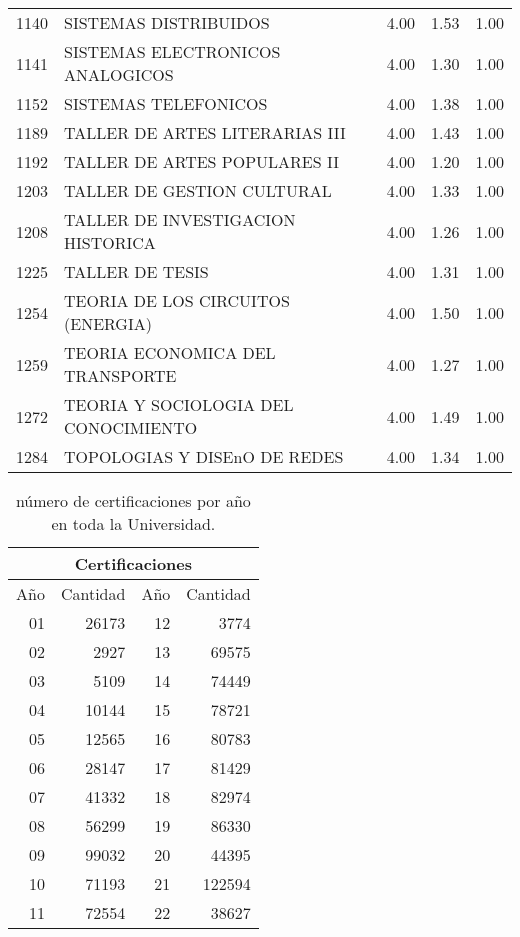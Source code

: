 \documentclass[12pt]{article}
\begin{document}
\begin{table}[ht]
\begin{tabular}{rlrrr}
  1140 & SISTEMAS DISTRIBUIDOS & 4.00 & 1.53 & 1.00 \\ 
  1141 & SISTEMAS ELECTRONICOS ANALOGICOS & 4.00 & 1.30 & 1.00 \\ 
  1152 & SISTEMAS TELEFONICOS & 4.00 & 1.38 & 1.00 \\ 
  1189 & TALLER DE ARTES LITERARIAS III & 4.00 & 1.43 & 1.00 \\ 
  1192 & TALLER DE ARTES POPULARES II & 4.00 & 1.20 & 1.00 \\ 
  1203 & TALLER DE GESTION CULTURAL & 4.00 & 1.33 & 1.00 \\ 
  1208 & TALLER DE INVESTIGACION HISTORICA & 4.00 & 1.26 & 1.00 \\ 
  1225 & TALLER DE TESIS & 4.00 & 1.31 & 1.00 \\ 
  1254 & TEORIA DE LOS CIRCUITOS (ENERGIA) & 4.00 & 1.50 & 1.00 \\ 
  1259 & TEORIA ECONOMICA DEL TRANSPORTE & 4.00 & 1.27 & 1.00 \\ 
  1272 & TEORIA Y SOCIOLOGIA DEL CONOCIMIENTO & 4.00 & 1.49 & 1.00 \\ 
  1284 & TOPOLOGIAS Y DISEnO DE REDES & 4.00 & 1.34 & 1.00 \\ 
   \hline
\end{tabular}
\end{table}



\begin{table}[ht]
\centering
\begin{tabular}{||r||r||r|r||}\hline
\multicolumn{4}{|c|}{Certificaciones} \\\hline
Año  & Cantidad  & Año  & Cantidad  \\\hline
01 & 26173& 12 & 3774 \\ 
  02 & 2927 &13 & 69575  \\ 
  03 & 5109 & 14 & 74449\\ 
  04 & 10144 & 15 & 78721\\ 
  05 & 12565 &16 & 80783 \\ 
  06 & 28147 &17 & 81429\\ 
  07 & 41332 &18 & 82974\\ 
  08 & 56299 &19 & 86330\\ 
  09 & 99032 &20 & 44395\\ 
  10 & 71193 &21 & 122594 \\ 
  11 & 72554 &22 & 38627\\
\hline
\end{tabular}
\caption{\label{CertificacionesAnual}n\'umero de certificaciones por a\~no en toda la Universidad.}
\end{table}
\end{document}
